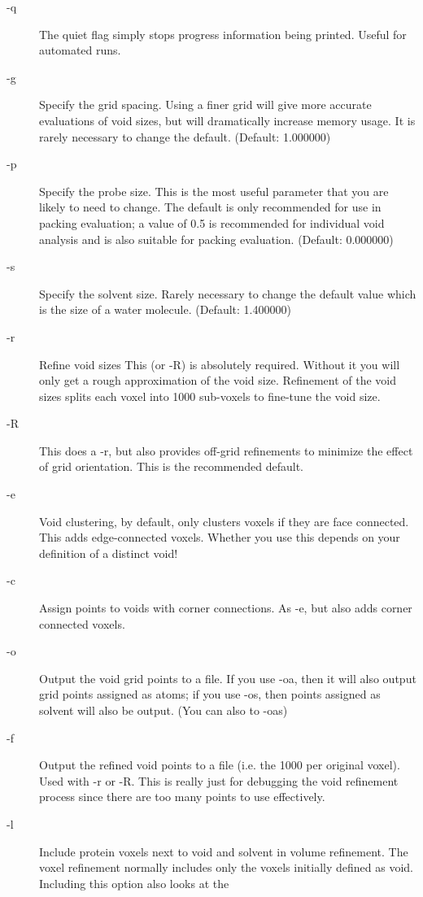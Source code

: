 \documentclass{article}
\begin{document}
\begin{description}
\item[-q] The quiet flag simply stops progress information being
  printed. Useful for automated runs.
\item[-g] Specify the grid spacing. Using a finer grid will give more
  accurate evaluations of void sizes, but will dramatically increase
  memory usage. It is rarely necessary to change the
  default. (Default: 1.000000) 
\item[-p] Specify the probe size. This is the most useful parameter
  that you are likely to need to change. The default is only
  recommended for use in packing evaluation; a value of 0.5 is
  recommended for individual void analysis and is also suitable for
  packing evaluation. (Default: 0.000000)
\item[-s] Specify the solvent size. Rarely necessary to change the
  default value which is the size of a water molecule. (Default: 1.400000)
\item[-r] Refine void sizes
  This (or -R) is absolutely required. Without it you will only get a
  rough approximation of the void size. Refinement of the void sizes
  splits each voxel into 1000 sub-voxels to fine-tune the void size.
\item[-R] This does a -r, but also provides off-grid refinements to
  minimize the effect of grid orientation. This is the recommended default.
\item[-e] Void clustering, by default, only clusters voxels if they
  are face connected. This adds edge-connected voxels. Whether you use
  this depends on your definition of a distinct void!
\item[-c] Assign points to voids with corner connections. As -e, but
  also adds corner connected voxels.
\item[-o] Output the void grid points to a file. If you use -oa, then
  it will also output grid points assigned as atoms; if you use -os,
  then points assigned as solvent will also be output. (You can also
  to -oas)
\item[-f] Output the refined void points to a file (i.e. the 1000 per
  original voxel). Used with -r or -R. This is really just for
  debugging the void refinement process since there are too many
  points to use effectively.
\item[-l] Include protein voxels next to void and solvent in volume 
  refinement. The voxel refinement normally includes only the voxels
  initially defined as void. Including this option also looks at the

\end{description}
\end{document}
